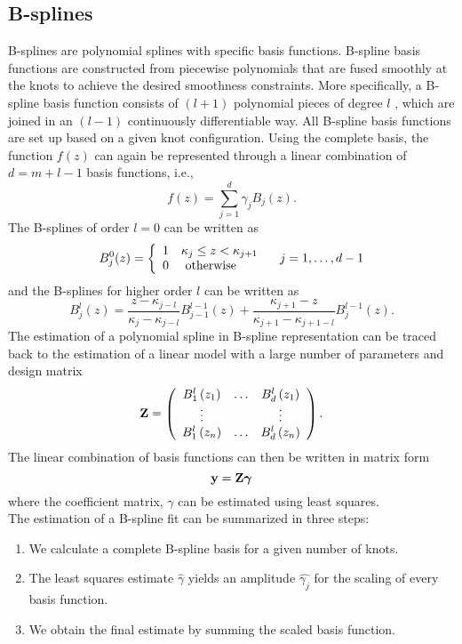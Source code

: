 \subsection{B-splines}
B-splines are polynomial splines with specific basis functions. B-spline basis functions are constructed
from piecewise polynomials that are fused smoothly at the knots to achieve the desired smoothness constraints. More specifically, a B-spline basis function consists
of $(l+1)$ polynomial pieces of degree $l$ , which are joined in an $(l-1)$ continuously differentiable way. All B-spline basis functions are set up based on a given knot configuration. Using the complete basis, the function $f(z)$ can again be represented through a linear combination of $d = m + l-1$ basis
functions, i.e.,
\[f ( z ) = \sum _ { j = 1 } ^ { d } \gamma _ { j } B _ { j } ( z )\text{.}\]
The B-splines of order $l=0$ can be written as
\[B _ { j } ^ { 0 } ( z ) = \left\{ \begin{array} { l l } { 1 } & { \kappa _ { j } \leq z < \kappa _ { j + 1 } } \\ { 0 } & { \text { otherwise } } \end{array} \right. \quad j = 1 , \ldots , d - 1\]
and the B-splines for higher order $l$ can be written as
\[B _ { j } ^ { l } ( z ) = \frac { z - \kappa _ { j - l } } { \kappa _ { j } - \kappa _ { j - l } } B _ { j - 1 } ^ { l - 1 } ( z ) + \frac { \kappa _ { j + 1 } - z } { \kappa _ { j + 1 } - \kappa _ { j + 1 - l } } B _ { j } ^ { l - 1 } ( z ) \text{.}\]
The estimation of a polynomial spline in B-spline representation can be traced back to the estimation of a linear model with a large number of parameters and design matrix 
\[\mathbf{Z}= \left( \begin{array} { c c c } { B _ { 1 } ^ { l } \left( z _ { 1 } \right) } & { \dots } & { B _ { d } ^ { l } \left( z _ { 1 } \right) } \\ { \vdots } & { } & { \vdots } \\ { B _ { 1 } ^ { l } \left( z _ { n } \right) } & { \dots } & { B _ { d } ^ { l } \left( z _ { n } \right) } \end{array} \right) \text{.} \]
The linear combination of basis functions can then be written in matrix form
\[ \mathbf{y} = \mathbf{Z} \mbox{\boldmath$\gamma$} \]
where the coefficient matrix, {\boldmath$\gamma$} can be estimated using least squares.\\
The estimation of a B-spline fit can be summarized in three steps:
\begin{enumerate}
\item We calculate a complete B-spline basis for a given number of knots.
\item The least squares estimate {\boldmath$\hat{\gamma}$} yields an amplitude $\hat{\gamma_j}$ for the scaling of every basis function.
\item We obtain the final estimate by summing the scaled basis function.
\end{enumerate}

